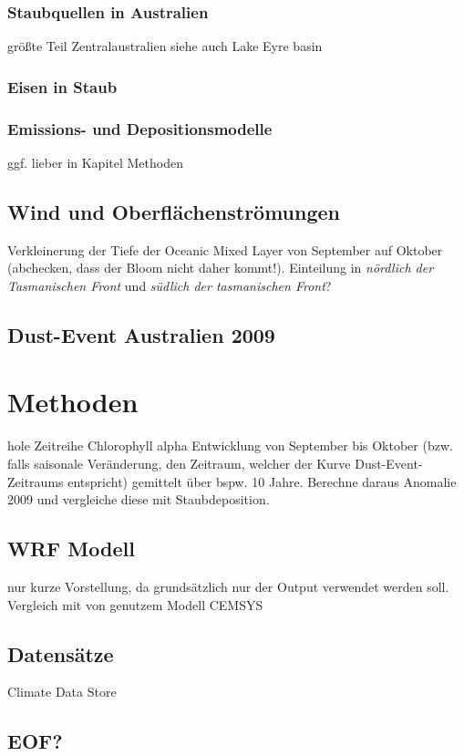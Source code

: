 \documentclass[12pt,a4paper,onecolumn]{scrartcl}
\begin{document}
\subsubsection{Staubquellen in Australien}
größte Teil Zentralaustralien \citep{Shao.2011} siehe auch Lake Eyre basin
\subsubsection{Eisen in Staub}
\subsubsection{Emissions- und Depositionsmodelle}
ggf. lieber in Kapitel Methoden
\subsection{Wind und Oberflächenströmungen}
Verkleinerung der Tiefe der Oceanic Mixed Layer von September auf Oktober \citep{Tilburg.2002} (abchecken, dass der Bloom nicht daher kommt!). Einteilung in \textit{nördlich der Tasmanischen Front} und \textit{südlich der tasmanischen Front}? 
\subsection{Dust-Event Australien 2009}




\section{Methoden}
hole Zeitreihe Chlorophyll alpha Entwicklung von September bis Oktober (bzw. falls saisonale Veränderung, den Zeitraum, welcher der Kurve Dust-Event-Zeitraums entspricht) gemittelt über bspw. 10 Jahre. Berechne daraus Anomalie 2009 und vergleiche diese mit Staubdeposition.
\subsection{WRF Modell}
nur kurze Vorstellung, da grundsätzlich nur der Output verwendet werden soll. Vergleich mit von \cite{Gabric.2016} genutzem Modell CEMSYS
\subsection{Datensätze}
Climate Data Store \nocite{*}
\subsection{EOF?}
\end{document}
